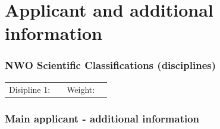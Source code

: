 \documentclass[a4paper,10pt,fleqn]{application}
\begin{document}

\part{Applicant and additional information}

\section{NWO Scientific Classifications (disciplines)}

\begin{tabular}{ p{3cm} p{3cm} p{3cm} p{3cm}  }
 Disipline 1:   &     & Weight: &   \\

\end{tabular}


\section{Main applicant - additional information}
\end{document}
